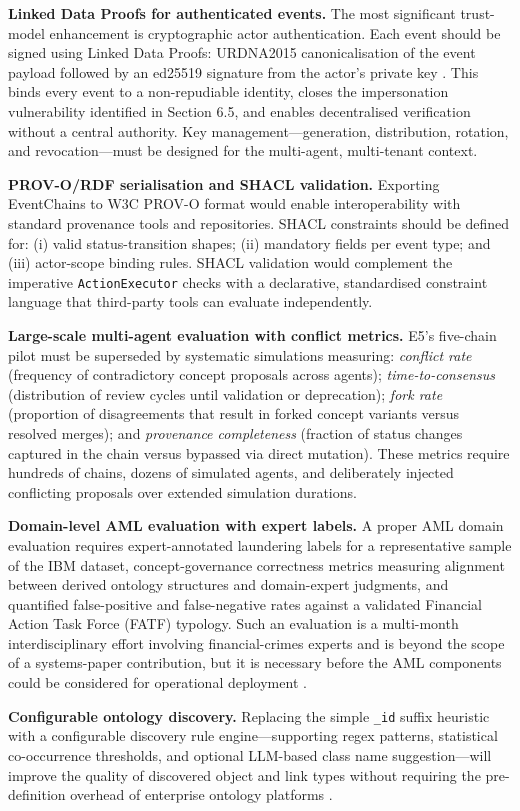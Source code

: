 \textbf{Linked Data Proofs for authenticated events.} The most significant trust-model enhancement is cryptographic actor authentication. Each event should be signed using Linked Data Proofs: URDNA2015 canonicalisation of the event payload followed by an ed25519 signature from the actor's private key \cite{ref20}. This binds every event to a non-repudiable identity, closes the impersonation vulnerability identified in Section 6.5, and enables decentralised verification without a central authority. Key management---generation, distribution, rotation, and revocation---must be designed for the multi-agent, multi-tenant context.

\textbf{PROV-O/RDF serialisation and SHACL validation.} Exporting EventChains to W3C PROV-O format \cite{ref19} would enable interoperability with standard provenance tools and repositories. SHACL constraints should be defined for: (i) valid status-transition shapes; (ii) mandatory fields per event type; and (iii) actor-scope binding rules. SHACL validation would complement the imperative \texttt{ActionExecutor} checks with a declarative, standardised constraint language that third-party tools can evaluate independently.

\textbf{Large-scale multi-agent evaluation with conflict metrics.} E5's five-chain pilot must be superseded by systematic simulations measuring: \emph{conflict rate} (frequency of contradictory concept proposals across agents); \emph{time-to-consensus} (distribution of review cycles until validation or deprecation); \emph{fork rate} (proportion of disagreements that result in forked concept variants versus resolved merges); and \emph{provenance completeness} (fraction of status changes captured in the chain versus bypassed via direct mutation). These metrics require hundreds of chains, dozens of simulated agents, and deliberately injected conflicting proposals over extended simulation durations.

\textbf{Domain-level AML evaluation with expert labels.} A proper AML domain evaluation requires expert-annotated laundering labels for a representative sample of the IBM dataset, concept-governance correctness metrics measuring alignment between derived ontology structures and domain-expert judgments, and quantified false-positive and false-negative rates against a validated Financial Action Task Force (FATF) typology. Such an evaluation is a multi-month interdisciplinary effort involving financial-crimes experts and is beyond the scope of a systems-paper contribution, but it is necessary before the AML components could be considered for operational deployment \cite{ref16}.

\textbf{Configurable ontology discovery.} Replacing the simple \texttt{\_id} suffix heuristic with a configurable discovery rule engine---supporting regex patterns, statistical co-occurrence thresholds, and optional LLM-based class name suggestion---will improve the quality of discovered object and link types without requiring the pre-definition overhead of enterprise ontology platforms \cite{ref7}.
